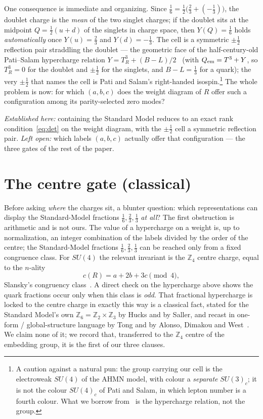 \documentclass[11pt,a4paper]{article}
\newcommand{\ZZ}{\mathbb{Z}}
\begin{document}
One consequence is immediate and organizing. Since
$\tfrac16=\tfrac12\big(\tfrac23+(-\tfrac13)\big)$,
the doublet charge is the \emph{mean} of the two singlet charges; if the doublet sits at
the midpoint $Q=\tfrac12(u+d)$ of the singlets in charge space, then $Y(Q)=\tfrac16$ holds
\emph{automatically} once $Y(u)=\tfrac23$ and $Y(d)=-\tfrac13$. The cell is a symmetric
$\pm\tfrac12$ reflection pair straddling the doublet --- the geometric face of the
half-century-old Pati--Salam hypercharge relation $Y=T^3_R+(B-L)/2$~\cite{PatiSalam} (with
$Q_{\rm em}=T^3+Y$, so $T^3_R=0$ for the doublet and $\pm\tfrac12$ for the singlets, and
$B-L=\tfrac13$ for a quark); the very $\pm\tfrac12$ that names the cell is Pati and Salam's
right-handed isospin.\footnote{A caution against a natural pun: the group carrying our cell
is the electroweak $SU(4)$ of the AHMN model, with colour a \emph{separate} $SU(3)_c$; it is
not the colour $SU(4)_c$ of Pati and Salam, in which lepton number is a fourth colour. What
we borrow from~\cite{PatiSalam} is the hypercharge relation, not the group.} The whole
problem is now: for which $(a,b,c)$
does the weight diagram of $R$ offer such a configuration among its parity-selected zero
modes?

\emph{Established here:} containing the Standard Model reduces to an exact rank
condition~\eqref{eq:det} on the weight diagram, with the $\pm\tfrac12$ cell a symmetric
reflection pair. \emph{Left open:} which labels $(a,b,c)$ actually offer that
configuration --- the three gates of the rest of the paper.

\section{The centre gate (classical)}\label{sec:centre}
Before asking \emph{where} the charges sit, a blunter question: which representations can
display the Standard-Model fractions $\tfrac16,\tfrac23,\tfrac13$ \emph{at all}? The first
obstruction is arithmetic and is not ours. The value of a hypercharge on a
weight is, up to normalization, an integer combination of the labels divided by the order
of the centre; the Standard-Model fractions $\tfrac16,\tfrac23,\tfrac13$ can be reached
only from a fixed congruence class. For $SU(4)$ the relevant invariant is the $\ZZ_4$
centre charge, equal to the $n$-ality
\begin{equation}
c(R)=a+2b+3c \pmod 4,
\end{equation}
Slansky's congruency class~\cite{Slansky}. A direct check on the hypercharge above shows
the quark fractions occur only when this class is \emph{odd}. That fractional hypercharge
is locked to the centre charge in exactly this way is a classical fact, stated for the
Standard Model's own $\ZZ_6=\ZZ_2\times\ZZ_3$ by Hucks and by Saller, and recast in
one-form / global-structure language by Tong and by Alonso, Dimakou and
West~\cite{Hucks,Saller,Tong,Alonso}. We claim none of it; we record that, transferred to
the $\ZZ_4$ centre of the embedding group, it is the first of our three clauses.
\end{document}
